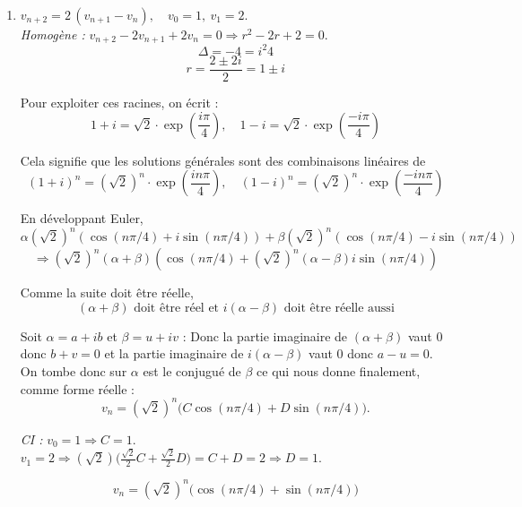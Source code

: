 \begin{solution}
\begin{enumerate}
\[
\boxed{\,z_n=\Big(\tfrac12-\tfrac{n}{3}\Big)(-3)^n+n+\tfrac{3}{2}\,}
\] \\

\item $\displaystyle v_{n+2}=2\,(v_{n+1}-v_n),\quad v_0=1,\ v_1=2.$ \\

\textit{Homogène :} $v_{n+2}-2v_{n+1}+2v_n=0 \Rightarrow r^2-2r+2=0.$ \\
\[
\Delta = -4 = i^2 4
\]
\[
r = \frac{2 \pm 2i}{2} = 1 \pm i
\]

Pour exploiter ces racines, on écrit : 
\[
1 + i = \sqrt{2} \cdot \exp(\frac{i \pi}{4}), \quad 1 - i = \sqrt{2} \cdot \exp(\frac{-i \pi}{4})
\]

Cela signifie que les solutions générales sont des combinaisons linéaires de 
\[
(1 + i)^n = (\sqrt{2})^n \cdot \exp(\frac{i n \pi}{4}), \quad (1 - i)^n = (\sqrt{2})^n \cdot \exp(\frac{-i n \pi}{4})
\]

En développant Euler, 
\[
\alpha (\sqrt{2})^n (\cos{(n \pi / 4)} + i \sin{(n \pi / 4)}) + \beta (\sqrt{2})^n (\cos{(n \pi / 4)} - i \sin{(n \pi / 4)})
\]
\[
\Rightarrow (\sqrt{2})^n (\alpha + \beta) (\cos{(n \pi / 4)} + (\sqrt{2})^n (\alpha - \beta ) i \sin{(n \pi / 4)})
\]

Comme la suite doit être réelle, 
\[
(\alpha + \beta) \text{ doit être réel et } i(\alpha - \beta) \text{ doit être réelle aussi}
\]

Soit $\alpha = a + i b$ et $\beta = u + iv$ :
Donc la partie imaginaire de $(\alpha + \beta)$ vaut 0 donc $b + v = 0$ et la partie imaginaire de $i(\alpha - \beta)$ vaut 0 donc $a - u = 0$.
On tombe donc sur $\alpha$ est le conjugué de $\beta$ ce qui nous donne finalement, comme forme réelle :
\[
v_n=(\sqrt2)^n\big(C\cos(n\pi/4)+D\sin(n\pi/4)\big).
\]

\textit{CI :} $v_0=1 \Rightarrow C=1.$  \\
$v_1=2 \Rightarrow (\sqrt2)\big(\tfrac{\sqrt2}{2}C+\tfrac{\sqrt2}{2}D\big)=C+D=2 \Rightarrow D=1.$

\[
\boxed{\,v_n=(\sqrt2)^n\big(\cos(n\pi/4)+\sin(n\pi/4)\big)\,}
\]
\end{enumerate}
\end{solution}

